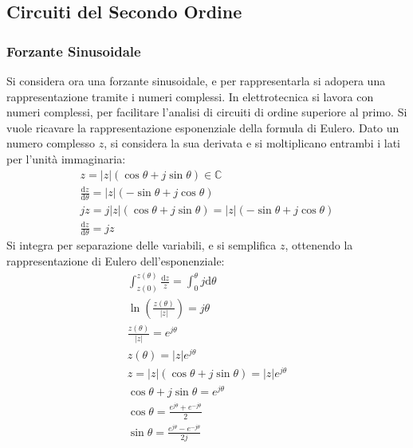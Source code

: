 \documentclass{article}
\newcommand{\df}{\mathrm{d}}
\numberwithin{equation}{subsection}
\begin{document}
\subsection{Circuiti del Secondo Ordine}

\subsubsection{Forzante Sinusoidale}

Si considera ora una forzante sinusoidale, e per rappresentarla si adopera una rappresentazione tramite i numeri complessi. 
In elettrotecnica si lavora con numeri complessi, per facilitare l'analisi di circuiti di ordine superiore al primo. 
Si vuole ricavare la rappresentazione esponenziale della formula di Eulero. 
Dato un numero complesso $z$, si considera la sua derivata e si moltiplicano entrambi i lati per l'unità immaginaria:
\begin{gather*}
    z=|z|(\cos\theta+j\sin\theta)\in\mathbb{C}\\
    \displaystyle\frac{\df z}{\df\theta}=|z|(-\sin\theta+j\cos\theta)\\
    jz=j|z|(\cos\theta+j\sin\theta)=|z|(-\sin\theta+j\cos\theta)\\
    \displaystyle\frac{\df z}{\df\theta}=jz
\end{gather*}
Si integra per separazione delle variabili, e si semplifica $z$, ottenendo la rappresentazione di Eulero dell'esponenziale: 
\begin{gather*}
    \displaystyle\int_{z(0)}^{z(\theta)}\frac{\df z}{z}=\int_{0}^{\theta}j\df\theta\\
    \ln\left(\displaystyle\frac{z(\theta)}{|z|}\right)=j\theta\\
    \displaystyle\frac{z(\theta)}{|z|}=e^{j\theta}\\
    z(\theta)=|z|e^{j\theta}\\
    z=|z|(\cos\theta+j\sin\theta)=|z|e^{j\theta}\\
    \cos\theta+j\sin\theta=e^{j\theta}\\
    \cos\theta=\displaystyle\frac{e^{j\theta}+e^{-j\theta}}{2}\\
    \sin\theta=\displaystyle\frac{e^{j\theta}-e^{-j\theta}}{2j}
\end{gather*}
\end{document}
